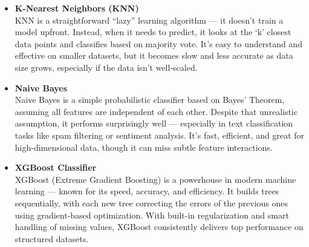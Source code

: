 \begin{itemize}

    \item \textbf{K-Nearest Neighbors (KNN)}\\
    KNN is a straightforward “lazy” learning algorithm — it doesn’t train a model upfront.
    Instead, when it needs to predict, it looks at the ‘k’ closest data points and classifies based on majority vote.
    It’s easy to understand and effective on smaller datasets, but it becomes slow and less accurate as data size grows, especially if the data isn’t well-scaled.


    \item \textbf{Naive Bayes}\\
    Naive Bayes is a simple probabilistic classifier based on Bayes’ Theorem, assuming all features are independent of each other.
    Despite that unrealistic assumption, it performs surprisingly well — especially in text classification tasks like spam filtering or sentiment analysis.
    It’s fast, efficient, and great for high-dimensional data, though it can miss subtle feature interactions.


    \item \textbf{XGBoost Classifier}\\
    XGBoost (Extreme Gradient Boosting) is a powerhouse in modern machine learning — known for its speed, accuracy, and efficiency.
    It builds trees sequentially, with each new tree correcting the errors of the previous ones using gradient-based optimization.
    With built-in regularization and smart handling of missing values, XGBoost consistently delivers top performance on structured datasets.



\end{itemize}
